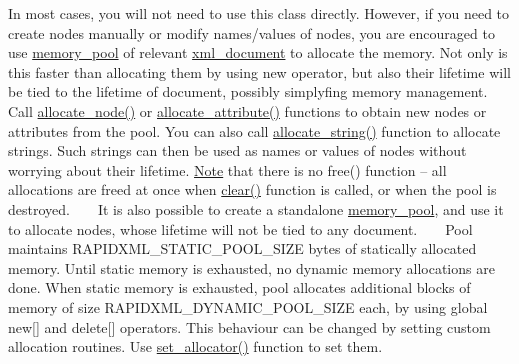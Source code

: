 In most cases, you will not need to use this class directly. However, if you need to create nodes manually or modify names/values of nodes, you are encouraged to use \mbox{\hyperlink{classrapidxml_1_1memory__pool}{memory\+\_\+pool}} of relevant \mbox{\hyperlink{classrapidxml_1_1xml__document}{xml\+\_\+document}} to allocate the memory. Not only is this faster than allocating them by using {\ttfamily new} operator, but also their lifetime will be tied to the lifetime of document, possibly simplyfing memory management. ~\newline
~\newline
 Call \mbox{\hyperlink{classrapidxml_1_1memory__pool_af74bb7be25f96b10917ceb1975f0a8d1}{allocate\+\_\+node()}} or \mbox{\hyperlink{classrapidxml_1_1memory__pool_aa7286aec00dac6d9af11cdc69e1e470e}{allocate\+\_\+attribute()}} functions to obtain new nodes or attributes from the pool. You can also call \mbox{\hyperlink{classrapidxml_1_1memory__pool_a74228316f70642f61d6a3a9b7f9ab826}{allocate\+\_\+string()}} function to allocate strings. Such strings can then be used as names or values of nodes without worrying about their lifetime. \mbox{\hyperlink{classNote}{Note}} that there is no {\ttfamily free()} function -- all allocations are freed at once when \mbox{\hyperlink{classrapidxml_1_1memory__pool_ac8bb3912a3ce86b15842e79d0b421204}{clear()}} function is called, or when the pool is destroyed. ~\newline
~\newline
 It is also possible to create a standalone \mbox{\hyperlink{classrapidxml_1_1memory__pool}{memory\+\_\+pool}}, and use it to allocate nodes, whose lifetime will not be tied to any document. ~\newline
~\newline
 Pool maintains {\ttfamily R\+A\+P\+I\+D\+X\+M\+L\+\_\+\+S\+T\+A\+T\+I\+C\+\_\+\+P\+O\+O\+L\+\_\+\+S\+I\+ZE} bytes of statically allocated memory. Until static memory is exhausted, no dynamic memory allocations are done. When static memory is exhausted, pool allocates additional blocks of memory of size {\ttfamily R\+A\+P\+I\+D\+X\+M\+L\+\_\+\+D\+Y\+N\+A\+M\+I\+C\+\_\+\+P\+O\+O\+L\+\_\+\+S\+I\+ZE} each, by using global {\ttfamily new\mbox{[}\mbox{]}} and {\ttfamily delete\mbox{[}\mbox{]}} operators. This behaviour can be changed by setting custom allocation routines. Use \mbox{\hyperlink{classrapidxml_1_1memory__pool_ac0a55a6ef0837dca67572e357100d78a}{set\+\_\+allocator()}} function to set them. ~\newline
~\newline

